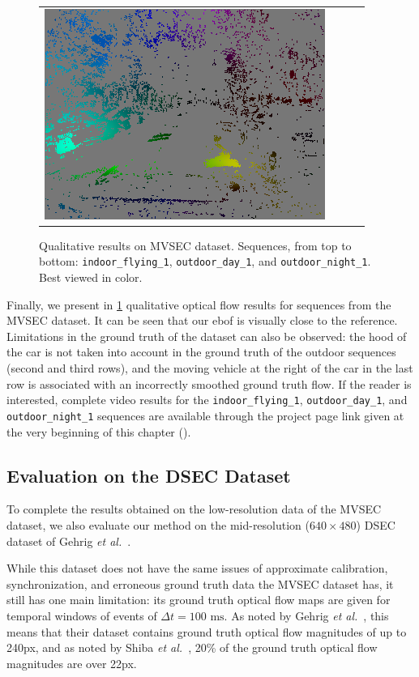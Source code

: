 \begin{figure}
\begin{tabular}{@{}cccc@{}}
    \includegraphics[width=0.245\linewidth]{mainmatter/figures/3_optical_flow/results_mvsec/outdoor_night1_our_flow_gray.png} \\
  \end{tabular}
  \cprotect\caption{Qualitative results on MVSEC dataset. Sequences, from top to bottom: \verb|indoor_flying_1|, \verb|outdoor_day_1|, and \verb|outdoor_night_1|. Best viewed in color.}\label{fig:ebof:results_mvsec}
\end{figure}

Finally, we present in \cref{fig:ebof:results_mvsec} qualitative optical flow results for sequences from the MVSEC dataset. It can be seen that our \acrshort{ebof} is visually close to the reference. Limitations in the ground truth of the dataset can also be observed: the hood of the car is not taken into account in the ground truth of the outdoor sequences (second and third rows), and the moving vehicle at the right of the car in the last row is associated with an incorrectly smoothed ground truth flow. If the reader is interested, complete video results for the \verb|indoor_flying_1|, \verb|outdoor_day_1|, and \verb|outdoor_night_1| sequences are available through the project page link given at the very beginning of this chapter ().

\subsection{Evaluation on the DSEC Dataset}\label{sec:ebof:eval_dsec}
To complete the results obtained on the low-resolution data of the MVSEC dataset, we also evaluate our method on the mid-resolution (\(640\times480\)) DSEC dataset of Gehrig \textit{et al.}~\cite{Gehrig2021DSECAS}.

While this dataset does not have the same issues of approximate calibration, synchronization, and erroneous ground truth data the MVSEC dataset has, it still has one main limitation: its ground truth optical flow maps are given for temporal windows of events of \(\Delta t = 100\text{ ms}\). As noted by Gehrig \textit{et al.}~\cite{Gehrig2021DenseOF}, this means that their dataset contains ground truth optical flow magnitudes of up to 240px, and as noted by Shiba \textit{et al.}~\cite{Shiba2022SecretsOE}, 20\% of the ground truth optical flow magnitudes are over 22px.

